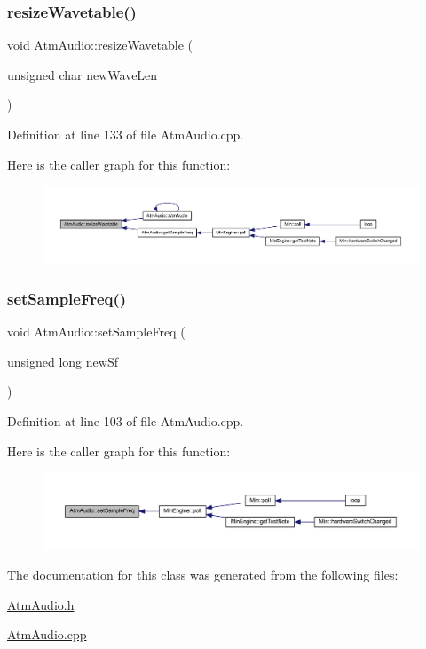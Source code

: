 \subsubsection{\texorpdfstring{resize\+Wavetable()}{resizeWavetable()}}
{\footnotesize\ttfamily void Atm\+Audio\+::resize\+Wavetable (\begin{DoxyParamCaption}\item[{unsigned char}]{new\+Wave\+Len }\end{DoxyParamCaption})}



Definition at line 133 of file Atm\+Audio.\+cpp.

Here is the caller graph for this function\+:
\nopagebreak
\begin{figure}[H]
\begin{center}
\leavevmode
\includegraphics[width=350pt]{d2/de6/class_atm_audio_ab634d78d1e88550a4ed0ff1d93ed2d97_icgraph}
\end{center}
\end{figure}
\mbox{\label{class_atm_audio_ab27c4dabb9e47a386de693b47422bb2a}} 
\subsubsection{\texorpdfstring{set\+Sample\+Freq()}{setSampleFreq()}}
{\footnotesize\ttfamily void Atm\+Audio\+::set\+Sample\+Freq (\begin{DoxyParamCaption}\item[{unsigned long}]{new\+Sf }\end{DoxyParamCaption})}



Definition at line 103 of file Atm\+Audio.\+cpp.

Here is the caller graph for this function\+:
\nopagebreak
\begin{figure}[H]
\begin{center}
\leavevmode
\includegraphics[width=350pt]{d2/de6/class_atm_audio_ab27c4dabb9e47a386de693b47422bb2a_icgraph}
\end{center}
\end{figure}


The documentation for this class was generated from the following files\+:\begin{DoxyCompactItemize}
\item 
\hyperlink{_atm_audio_8h}{Atm\+Audio.\+h}\item 
\hyperlink{_atm_audio_8cpp}{Atm\+Audio.\+cpp}\end{DoxyCompactItemize}
